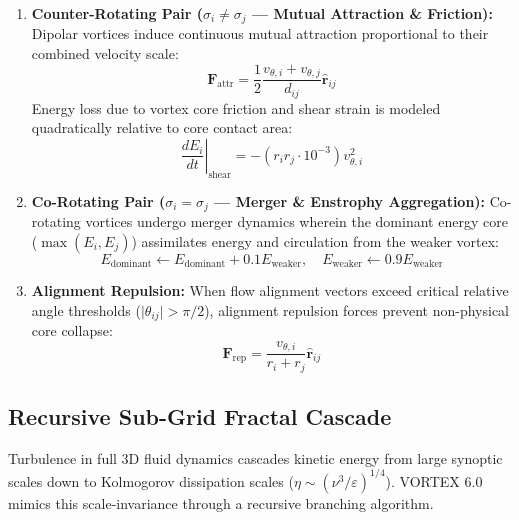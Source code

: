 \documentclass[11pt, a4paper]{article}
\begin{document}
\begin{enumerate}[label=\arabic*.]
    \item \textbf{Counter-Rotating Pair ($\sigma_i \neq \sigma_j$ --- Mutual Attraction \& Friction):}
    Dipolar vortices induce continuous mutual attraction proportional to their combined velocity scale:
    \begin{equation}
    \mathbf{F}_{\text{attr}} = \frac{1}{2} \frac{v_{\theta, i} + v_{\theta, j}}{d_{ij}} \hat{\mathbf{r}}_{ij}
    \end{equation}
    Energy loss due to vortex core friction and shear strain is modeled quadratically relative to core contact area:
    \begin{equation}
    \left.\frac{dE_i}{dt}\right\vert_{\text{shear}} = - (r_i r_j \cdot 10^{-3}) v_{\theta, i}^2
    \end{equation}

    \item \textbf{Co-Rotating Pair ($\sigma_i = \sigma_j$ --- Merger \& Enstrophy Aggregation):}
    Co-rotating vortices undergo merger dynamics wherein the dominant energy core ($\max(E_i, E_j)$) assimilates energy and circulation from the weaker vortex:
    \begin{equation}
    E_{\text{dominant}} \leftarrow E_{\text{dominant}} + 0.1 E_{\text{weaker}}, \quad E_{\text{weaker}} \leftarrow 0.9 E_{\text{weaker}}
    \end{equation}

    \item \textbf{Alignment Repulsion:}
    When flow alignment vectors exceed critical relative angle thresholds ($\vert\theta_{ij}\vert > \pi/2$), alignment repulsion forces prevent non-physical core collapse:
    \begin{equation}
    \mathbf{F}_{\text{rep}} = \frac{v_{\theta, i}}{r_i + r_j} \hat{\mathbf{r}}_{ij}
    \end{equation}
\end{enumerate}

\subsection{Recursive Sub-Grid Fractal Cascade}

Turbulence in full 3D fluid dynamics cascades kinetic energy from large synoptic scales down to Kolmogorov dissipation scales ($\eta \sim (\nu^3 / \varepsilon)^{1/4}$). VORTEX 6.0 mimics this scale-invariance through a recursive branching algorithm.
\end{document}
